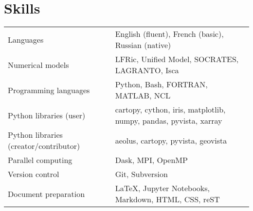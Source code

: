 \documentclass[a4paper, 11pt]{article}
\begin{document}
\section{Skills}
\begin{tabularx}{\linewidth}{@{}l X@{}}
Languages & English (fluent), French (basic), Russian (native) \\
Numerical models & LFRic, Unified Model, SOCRATES, LAGRANTO, Isca \\
Programming languages & Python, Bash, FORTRAN, MATLAB, NCL \\
Python libraries (user) & cartopy, cython, iris, matplotlib, numpy, pandas, pyvista, xarray \\
Python libraries (creator/contributor) & aeolus, cartopy, pyvista, geovista \\
Parallel computing & Dask, MPI, OpenMP \\
Version control & Git, Subversion \\
Document preparation & \LaTeX, Jupyter Notebooks, Markdown, HTML, CSS, reST
\end{tabularx}

\end{document}
